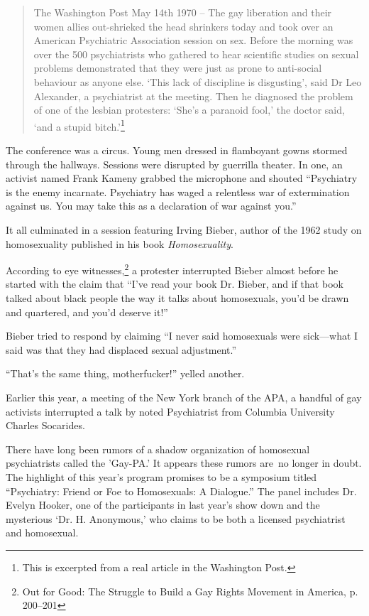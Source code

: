 \begin{quote}

The Washington Post May 14th 1970 -- The gay liberation and their women allies out-shrieked the head shrinkers today and took over an American Psychiatric Association session on sex. Before the morning was over the 500 psychiatrists who gathered to hear scientific studies on sexual problems demonstrated that they were just as prone to anti-social behaviour as anyone else. `This lack of discipline is disgusting', said Dr Leo Alexander, a psychiatrist at the meeting. Then he diagnosed the problem of one of the lesbian protesters: `She's a paranoid fool,' the doctor said, `and a stupid bitch.'\footnote{This is excerpted from a real article in the Washington Post.}
\end{quote}

The conference was a circus. Young men dressed in flamboyant gowns stormed through the hallways. Sessions were disrupted by guerrilla theater. In one, an activist named Frank Kameny grabbed the microphone and shouted “Psychiatry is the enemy incarnate. Psychiatry has waged a relentless war of extermination against us. You may take this as a declaration of war against you.”

It all culminated in a session featuring Irving Bieber, author of the 1962 study on homosexuality published in his book \emph{Homosexuality}.

According to eye witnesses,\footnote{Out for Good: The Struggle to Build a Gay Rights Movement in America, p. 200--201} a protester interrupted Bieber almost before he started with the claim that “I've read your book Dr. Bieber, and if that book talked about black people the way it talks about homosexuals, you'd be drawn and quartered, and you'd deserve it!” 

Bieber tried to respond by claiming “I never said homosexuals were sick—what I said was that they had displaced sexual adjustment.” 

“That's the same thing, motherfucker!” yelled another.

Earlier this year, a meeting of the New York branch of the APA, a handful of gay activists interrupted a talk by noted Psychiatrist from Columbia University Charles Socarides.

There have long been rumors of a shadow organization of homosexual psychiatrists called the 'Gay-PA.’ It appears these rumors are no longer in doubt. The highlight of this year's program promises to be a symposium titled “Psychiatry: Friend or Foe to Homosexuals: A Dialogue.” The panel includes Dr. Evelyn Hooker, one of the participants in last year's show down and the mysterious `Dr. H. Anonymous,' who claims to be both a licensed psychiatrist and homosexual.

